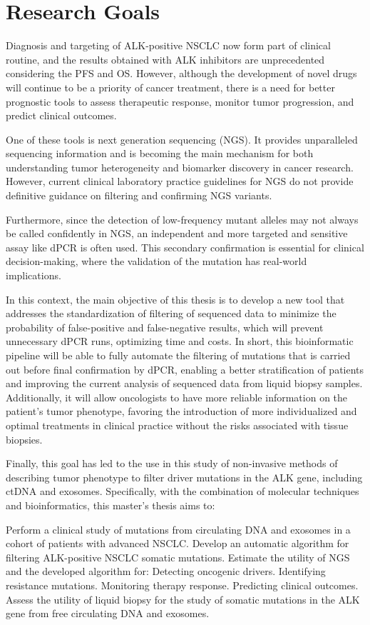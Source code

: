 \chapter{Research Goals}

Diagnosis and targeting of ALK-positive NSCLC now form part of clinical routine, and the results obtained with ALK inhibitors are unprecedented considering the PFS and OS. However, although the development of novel drugs will continue to be a priority of cancer treatment, there is a need for better prognostic tools to assess therapeutic response, monitor tumor progression, and predict clinical outcomes.

One of these tools is next generation sequencing (NGS). It provides unparalleled sequencing information and is becoming the main mechanism for both understanding tumor heterogeneity and biomarker discovery in cancer research. However, current clinical laboratory practice guidelines for NGS do not provide definitive guidance on filtering and confirming NGS variants.

Furthermore, since the detection of low-frequency mutant alleles may not always be called confidently in NGS, an independent and more targeted and sensitive assay like dPCR is often used. This secondary confirmation is essential for clinical decision-making, where the validation of the mutation has real-world implications.

In this context, the main objective of this thesis is to develop a new tool that addresses the standardization of filtering of sequenced data to minimize the probability of false-positive and false-negative results, which will prevent unnecessary dPCR runs, optimizing time and costs. In short, this bioinformatic pipeline will be able to fully automate the filtering of mutations that is carried out before final confirmation by dPCR, enabling a better stratification of patients and improving the current analysis of sequenced data from liquid biopsy samples. Additionally, it will allow oncologists to have more reliable information on the patient's tumor phenotype, favoring the introduction of more individualized and optimal treatments in clinical practice without the risks associated with tissue biopsies.

Finally, this goal has led to the use in this study of non-invasive methods of describing tumor phenotype to filter driver mutations in the ALK gene, including ctDNA and exosomes. Specifically, with the combination of molecular techniques and bioinformatics, this master's thesis aims to:
\begin{outline}
    \1 Perform a clinical study of mutations from circulating DNA and exosomes in a cohort of patients with advanced NSCLC.
    \1 Develop an automatic algorithm for filtering ALK-positive NSCLC somatic mutations.
    \1 Estimate the utility of NGS and the developed algorithm for:
        \2 Detecting oncogenic drivers.
        \2 Identifying resistance mutations.
        \2 Monitoring therapy response.
        \2 Predicting clinical outcomes.
    \1 Assess the utility of liquid biopsy for the study of somatic mutations in the ALK gene from free circulating DNA and exosomes.
\end{outline}